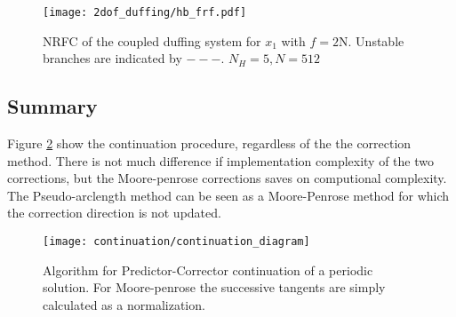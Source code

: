 \begin{figure}[!ht]
  \centering
  \texttt{[image: 2dof\_duffing/hb\_frf.pdf]}
  \caption{NRFC of the coupled duffing system for $x_1$ with $f=2$N. Unstable
    branches are indicated by $- - -$. $N_H = 5, N = 512$}
  \label{fig:hb_frf_2dof}
 \end{figure}

\subsection{Summary}
\label{sec:cont_summary}

Figure \ref{fig:cont_algo} show the continuation procedure, regardless of the
the correction method. There is not much difference if implementation complexity
of the two corrections, but the Moore-penrose corrections saves on computional
complexity. The Pseudo-arclength method can be seen as a Moore-Penrose method
for which the correction direction is not updated.

\begin{figure}[!ht]
  \centering
  \texttt{[image: continuation/continuation\_diagram]}
  \caption{Algorithm for Predictor-Corrector continuation of a periodic
    solution. For Moore-penrose the successive tangents are simply calculated as
  a normalization.}
  \label{fig:cont_algo}
\end{figure}



